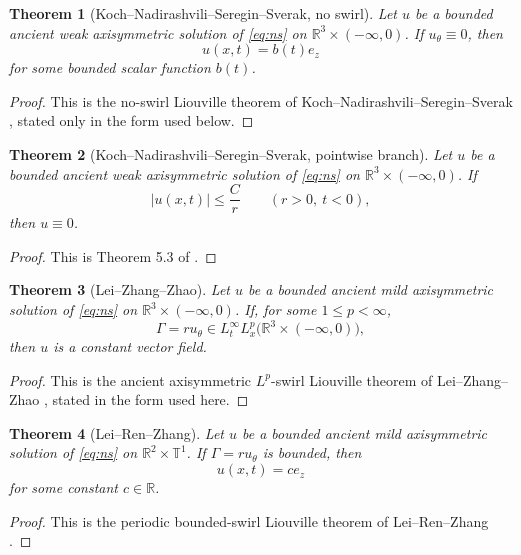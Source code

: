 \documentclass[11pt]{amsart}
\theoremstyle{plain}
\newtheorem{theorem}{Theorem}[section]
\theoremstyle{definition}
\theoremstyle{remark}
\numberwithin{equation}{section}
\begin{document}
\begin{theorem}[Koch--Nadirashvili--Seregin--Sverak, no swirl]\label{thm:knss-input}
Let \(u\) be a bounded ancient weak axisymmetric solution of \eqref{eq:ns} on
\(\mathbb R^3\times(-\infty,0)\).  If \(u_\theta\equiv0\), then
\[
   u(x,t)=b(t)e_z
\]
for some bounded scalar function \(b(t)\).
\end{theorem}

\begin{proof}
This is the no-swirl Liouville theorem of
Koch--Nadirashvili--Seregin--Sverak \cite{KNSS2009}, stated only in the form
used below.
\end{proof}

\begin{theorem}[Koch--Nadirashvili--Seregin--Sverak, pointwise branch]
\label{thm:knss-pointwise-input}
Let \(u\) be a bounded ancient weak axisymmetric solution of \eqref{eq:ns} on
\(\mathbb R^3\times(-\infty,0)\).  If
\[
   |u(x,t)|\le \frac{C}{r}
   \qquad (r>0,\ t<0),
\]
then \(u\equiv0\).
\end{theorem}

\begin{proof}
This is Theorem 5.3 of \cite{KNSS2009}.
\end{proof}

\begin{theorem}[Lei--Zhang--Zhao]\label{thm:lzz-input}
Let \(u\) be a bounded ancient mild axisymmetric solution of \eqref{eq:ns} on
\(\mathbb R^3\times(-\infty,0)\).  If, for some \(1\le p<\infty\),
\[
   \Gamma=ru_\theta\in L_t^\infty L_x^p
      \bigl(\mathbb R^3\times(-\infty,0)\bigr),
\]
then \(u\) is a constant vector field.
\end{theorem}

\begin{proof}
This is the ancient axisymmetric \(L^p\)-swirl Liouville theorem of
Lei--Zhang--Zhao \cite{LZZ}, stated in the form used here.
\end{proof}

\begin{theorem}[Lei--Ren--Zhang]\label{thm:lrz-input}
Let \(u\) be a bounded ancient mild axisymmetric solution of \eqref{eq:ns} on
\(\mathbb R^2\times\mathbb T^1\).  If \(\Gamma=ru_\theta\) is bounded, then
\[
   u(x,t)=ce_z
\]
for some constant \(c\in\mathbb R\).
\end{theorem}

\begin{proof}
This is the periodic bounded-swirl Liouville theorem of
Lei--Ren--Zhang \cite{LRZ}.
\end{proof}
\end{document}
